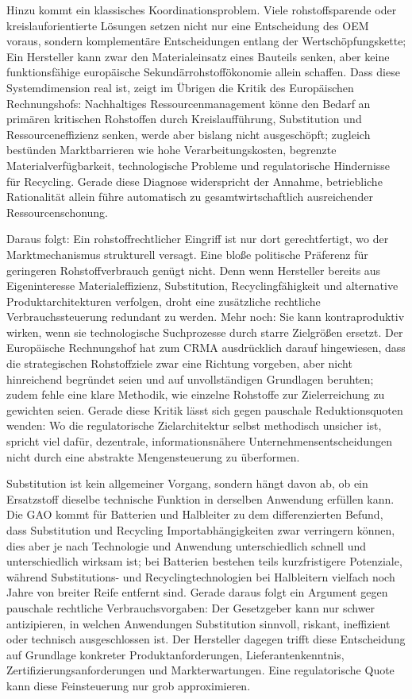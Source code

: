\documentclass[12pt,a4paper,oneside]{book} %
\begin{document}
{Hinzu kommt ein klassisches Koordinationsproblem. Viele rohstoffsparende oder kreislauforientierte Lösungen setzen nicht nur eine Entscheidung des OEM voraus, sondern komplementäre Entscheidungen entlang der Wertschöpfungskette; Ein Hersteller kann zwar den Materialeinsatz eines Bauteils senken, aber keine funktionsfähige europäische Sekundärrohstoffökonomie allein schaffen. Dass diese Systemdimension real ist, zeigt im Übrigen die Kritik des Europäischen Rechnungshofs: Nachhaltiges Ressourcenmanagement könne den Bedarf an primären kritischen Rohstoffen durch Kreislaufführung, Substitution und Ressourceneffizienz senken, werde aber bislang nicht ausgeschöpft; zugleich bestünden Marktbarrieren wie hohe Verarbeitungskosten, begrenzte Materialverfügbarkeit, technologische Probleme und regulatorische Hindernisse für Recycling. Gerade diese Diagnose widerspricht der Annahme, betriebliche Rationalität allein führe automatisch zu gesamtwirtschaftlich ausreichender Ressourcenschonung.

Daraus folgt: Ein rohstoffrechtlicher Eingriff ist nur dort gerechtfertigt, wo der Marktmechanismus strukturell versagt. Eine bloße politische Präferenz für geringeren Rohstoffverbrauch genügt nicht. Denn wenn Hersteller bereits aus Eigeninteresse Materialeffizienz, Substitution, Recyclingfähigkeit und alternative Produktarchitekturen verfolgen, droht eine zusätzliche rechtliche Verbrauchssteuerung redundant zu werden. Mehr noch: Sie kann kontraproduktiv wirken, wenn sie technologische Suchprozesse durch starre Zielgrößen ersetzt. Der Europäische Rechnungshof hat zum CRMA ausdrücklich darauf hingewiesen, dass die strategischen Rohstoffziele zwar eine Richtung vorgeben, aber nicht hinreichend begründet seien und auf unvollständigen Grundlagen beruhten; zudem fehle eine klare Methodik, wie einzelne Rohstoffe zur Zielerreichung zu gewichten seien. Gerade diese Kritik lässt sich gegen pauschale Reduktionsquoten wenden: Wo die regulatorische Zielarchitektur selbst methodisch unsicher ist, spricht viel dafür, dezentrale, informationsnähere Unternehmensentscheidungen nicht durch eine abstrakte Mengensteuerung zu überformen.

Substitution ist kein allgemeiner Vorgang, sondern hängt davon ab, ob ein Ersatzstoff dieselbe technische Funktion in derselben Anwendung erfüllen kann. Die GAO kommt für Batterien und Halbleiter zu dem differenzierten Befund, dass Substitution und Recycling Importabhängigkeiten zwar verringern können, dies aber je nach Technologie und Anwendung unterschiedlich schnell und unterschiedlich wirksam ist; bei Batterien bestehen teils kurzfristigere Potenziale, während Substitutions- und Recyclingtechnologien bei Halbleitern vielfach noch Jahre von breiter Reife entfernt sind. Gerade daraus folgt ein Argument gegen pauschale rechtliche Verbrauchsvorgaben: Der Gesetzgeber kann nur schwer antizipieren, in welchen Anwendungen Substitution sinnvoll, riskant, ineffizient oder technisch ausgeschlossen ist. Der Hersteller dagegen trifft diese Entscheidung auf Grundlage konkreter Produktanforderungen, Lieferantenkenntnis, Zertifizierungsanforderungen und Markterwartungen. Eine regulatorische Quote kann diese Feinsteuerung nur grob approximieren.

}
\end{document}
